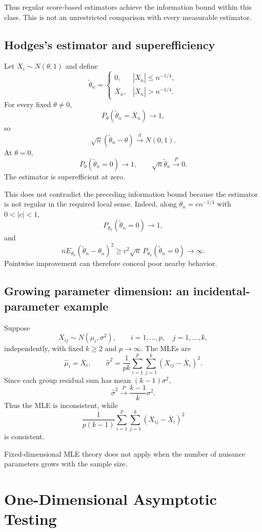Thus regular score-based estimators achieve the information bound
within this class. This is not an unrestricted comparison with
every measurable estimator.

\subsection{Hodges's estimator and superefficiency}

Let $X_i\sim N(\theta,1)$ and define
\[
\widetilde\theta_n=
\begin{cases}
0,&|\overline X_n|\leq n^{-1/4},\\
\overline X_n,&|\overline X_n|>n^{-1/4}.
\end{cases}
\]
For every fixed $\theta\neq0$,
\[
P_\theta(\widetilde\theta_n=\overline X_n)\to1,
\]
so
\[
\sqrt n(\widetilde\theta_n-\theta)
\xrightarrow{d}N(0,1).
\]
At $\theta=0$,
\[
P_0(\widetilde\theta_n=0)\to1,
\qquad
\sqrt n\widetilde\theta_n\xrightarrow{P}0.
\]
The estimator is superefficient at zero.

This does not contradict the preceding information bound because
the estimator is not regular in the required local sense.
Indeed, along $\theta_n=cn^{-1/4}$ with $0<|c|<1$,
\[
P_{\theta_n}(\widetilde\theta_n=0)\to1,
\]
and
\[
nE_{\theta_n}(\widetilde\theta_n-\theta_n)^2
\geq
c^2\sqrt n\,
P_{\theta_n}(\widetilde\theta_n=0)
\longrightarrow\infty.
\]
Pointwise improvement can therefore conceal poor nearby behavior.

\subsection{Growing parameter dimension: an incidental-parameter example}

Suppose
\[
X_{ij}\sim N(\mu_i,\sigma^2),
\qquad
i=1,\ldots,p,\quad j=1,\ldots,k,
\]
independently, with fixed $k\geq2$ and $p\to\infty$.
The MLEs are
\[
\widehat\mu_i=\overline X_i,
\qquad
\widehat\sigma^2
=
\frac1{pk}\sum_{i=1}^p\sum_{j=1}^k
(X_{ij}-\overline X_i)^2.
\]
Since each group residual sum has mean $(k-1)\sigma^2$,
\[
\widehat\sigma^2\xrightarrow{P}
\frac{k-1}{k}\sigma^2.
\]
Thus the MLE is inconsistent, while
\[
\frac1{p(k-1)}
\sum_{i=1}^p\sum_{j=1}^k
(X_{ij}-\overline X_i)^2
\]
is consistent.

Fixed-dimensional MLE theory does not apply when the number of
nuisance parameters grows with the sample size.

\section{One-Dimensional Asymptotic Testing}


